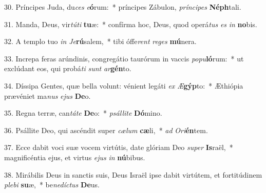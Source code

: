 30. Príncipes Juda, du\textit{ces} \textit{e}\textbf{ó}rum:~*  príncipes Zábulon, \textit{prín}\textit{ci}\textit{pes} \textbf{Néph}tali.\

31. Manda, Deus, vir\textit{tú}\textit{ti} \textbf{tu}æ:~*  confírma hoc, Deus, quod operá\textit{tus} \textit{es} \textit{in} \textbf{no}bis.\

32. A templo tuo \textit{in} \textit{Je}\textbf{rú}salem,~*  tibi óffe\textit{rent} \textit{re}\textit{ges} \textbf{mú}nera.\

33. Increpa feras arúndinis, congregátio taurórum in vaccis \textit{po}\textit{pu}\textbf{ló}rum:~*  ut exclúdant eos, qui probá\textit{ti} \textit{sunt} \textit{ar}\textbf{gén}to.\

34. Díssipa Gentes, quæ bella volunt: vénient legáti \textit{ex} \textit{Æ}\textbf{gýp}to:~*  Æthiópia prævéniet ma\textit{nus} \textit{e}\textit{jus} \textbf{De}o.\

35. Regna terræ, can\textit{tá}\textit{te} \textbf{De}o:~*  \textit{psál}\textit{li}\textit{te} \textbf{Dó}mino.\

36. Psállite Deo, qui ascéndit super \textit{cæ}\textit{lum} \textbf{cæ}li,~*  \textit{ad} \textit{O}\textit{ri}\textbf{én}tem.\

37. Ecce dabit voci suæ vocem virtútis, date glóriam Deo \textit{su}\textit{per} \textbf{Is}raël,~*  magnificéntia ejus, et virtus \textit{e}\textit{jus} \textit{in} \textbf{nú}bibus.\

38. Mirábilis Deus in sanctis suis, Deus Israël ipse dabit virtútem, et fortitúdinem \textit{ple}\textit{bi} \textbf{su}æ,~*  be\textit{ne}\textit{díc}\textit{tus} \textbf{De}us.\

